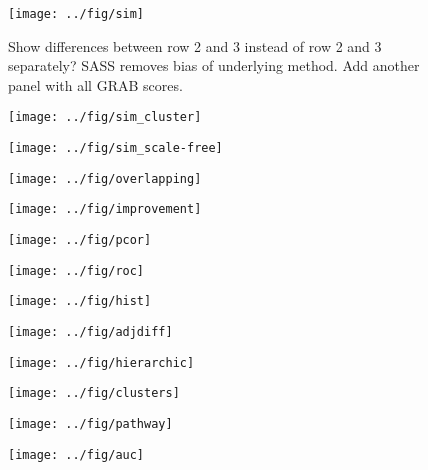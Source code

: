 \documentclass{article}
\begin{document}
\begin{figure}
  \centering
    \texttt{[image: ../fig/sim]}
  \caption{Show differences between row 2 and 3 instead of row 2 and 3 separately? SASS removes bias of underlying method. Add another panel with all GRAB scores.}
\end{figure}
\begin{figure}
  \centering
    \texttt{[image: ../fig/sim\_cluster]}
  \caption{}
\end{figure}
\begin{figure}
  \centering
    \texttt{[image: ../fig/sim\_scale-free]}
  \caption{}
\end{figure}
\begin{figure}
  \centering
    \texttt{[image: ../fig/overlapping]}
  \caption{}
\end{figure}
\begin{figure}
  \centering
    \texttt{[image: ../fig/improvement]}
  \caption{}
\end{figure}
\begin{figure}
  \centering
    \texttt{[image: ../fig/pcor]}
  \caption{}
\end{figure}
\begin{figure}
  \centering
    \texttt{[image: ../fig/roc]}
  \caption{}
\end{figure}
\begin{figure}
  \centering
    \texttt{[image: ../fig/hist]}
  \caption{}
\end{figure}
\begin{figure}
  \centering
    \texttt{[image: ../fig/adjdiff]}
  \caption{}
\end{figure}
\begin{figure}
  \centering
    \texttt{[image: ../fig/hierarchic]}
  \caption{}
\end{figure}
\begin{figure}
  \centering
    \texttt{[image: ../fig/clusters]}
  \caption{}
\end{figure}
\begin{figure}
  \centering
    \texttt{[image: ../fig/pathway]}
  \caption{}
\end{figure}
\begin{figure}
  \centering
    \texttt{[image: ../fig/auc]}
  \caption{}
\end{figure}
\end{document}
